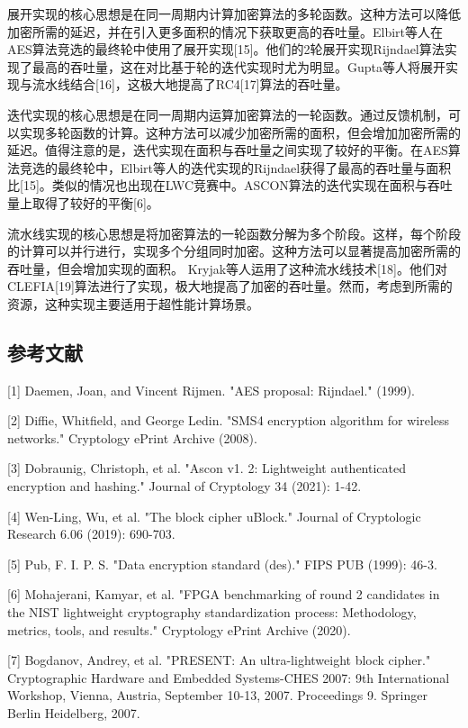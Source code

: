 \documentclass{ctexart}
\begin{document}
展开实现的核心思想是在同一周期内计算加密算法的多轮函数。这种方法可以降低加密所需的延迟，并在引入更多面积的情况下获取更高的吞吐量。Elbirt等人在AES算法竞选的最终轮中使用了展开实现[15]。他们的2轮展开实现Rijndael算法实现了最高的吞吐量，这在对比基于轮的迭代实现时尤为明显。Gupta等人将展开实现与流水线结合[16]，这极大地提高了RC4[17]算法的吞吐量。

迭代实现的核心思想是在同一周期内运算加密算法的一轮函数。通过反馈机制，可以实现多轮函数的计算。这种方法可以减少加密所需的面积，但会增加加密所需的延迟。值得注意的是，迭代实现在面积与吞吐量之间实现了较好的平衡。在AES算法竞选的最终轮中，Elbirt等人的迭代实现的Rijndael获得了最高的吞吐量与面积比[15]。类似的情况也出现在LWC竞赛中。ASCON算法的迭代实现在面积与吞吐量上取得了较好的平衡[6]。

流水线实现的核心思想是将加密算法的一轮函数分解为多个阶段。这样，每个阶段的计算可以并行进行，实现多个分组同时加密。这种方法可以显著提高加密所需的吞吐量，但会增加实现的面积。
Kryjak等人运用了这种流水线技术[18]。他们对CLEFIA[19]算法进行了实现，极大地提高了加密的吞吐量。然而，考虑到所需的资源，这种实现主要适用于超性能计算场景。



\subsection{参考文献}
[1] Daemen, Joan, and Vincent Rijmen. "AES proposal: Rijndael." (1999).

[2] Diffie, Whitfield, and George Ledin. "SMS4 encryption algorithm for wireless networks." Cryptology ePrint Archive (2008).

[3] Dobraunig, Christoph, et al. "Ascon v1. 2: Lightweight authenticated encryption and hashing." Journal of Cryptology 34 (2021): 1-42.

[4] Wen-Ling, Wu, et al. "The block cipher uBlock." Journal of Cryptologic Research 6.06 (2019): 690-703.

[5] Pub, F. I. P. S. "Data encryption standard (des)." FIPS PUB (1999): 46-3.

[6] Mohajerani, Kamyar, et al. "FPGA benchmarking of round 2 candidates in the NIST lightweight cryptography standardization process: Methodology, metrics, tools, and results." Cryptology ePrint Archive (2020).

[7] Bogdanov, Andrey, et al. "PRESENT: An ultra-lightweight block cipher." Cryptographic Hardware and Embedded Systems-CHES 2007: 9th International Workshop, Vienna, Austria, September 10-13, 2007. Proceedings 9. Springer Berlin Heidelberg, 2007.
\end{document}
